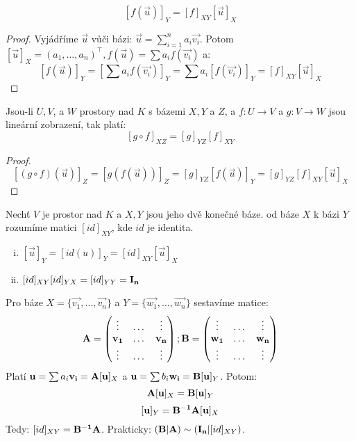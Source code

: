 \begin{observation}
    \leavevmode
    $$ [f(\vec{u})]_Y = [f]_{XY} [\vec{u}]_X$$
\end{observation}

\begin{proof}
    Vyjádříme $\vec{u}$ vůči bázi: $\vec{u} = \sum_{i=1}^{n} a_i \vec{v_i}$.
    Potom $[\vec{u}]_X = (a_1, \dots, a_n)^\top, f(\vec{u}) = 
    \sum a_i f(\vec{v_i})$ a:
    $$[f(\vec{u})]_Y = \left[\sum a_i f(\vec{v_i})\right]_Y = 
    \sum a_i [f(\vec{v_i})]_Y = [f]_{XY}[\vec{u}]_X$$
\end{proof}

\begin{observation}
    Jsou-li $U, V$, a $W$ prostory nad $K$ s bázemi $X, Y$ a $Z$, a 
    $f: U \rightarrow V$ a $g: V \rightarrow W$ jsou lineární zobrazení, tak
    platí:
    $$[g \circ f]_{XZ} = [g]_{YZ} [f]_{XY}$$
\end{observation}

\begin{proof}
    \leavevmode
    $$[(g \circ f)(\vec{u})]_Z = [g(f(\vec{u}))]_Z = [g]_{YZ}[f(\vec{u})]_Y =
    [g]_{YZ}[f]_{XY}[\vec{u}]_X$$
\end{proof}

\begin{definition}
    Nechť $V$ je prostor nad $K$ a $X, Y$ jsou jeho dvě konečné báze.
     od báze $X$ k bázi $Y$ rozumíme matici 
    $[id]_{XY}$, kde $id$ je identita.
\end{definition}

\begin{observation}
    \leavevmode
    \begin{enumerate}[i.]
        \item $[\vec{u}]_Y = [id(u)]_Y = [id]_{XY}[\vec{u}]_X$
        \item $[id]_{XY}[id]_{YX} = [id]_{YY} = \mathbf{I_n}$
    \end{enumerate}
\end{observation}

\begin{remark}[Výpočet matice přechodu pro $V = K^n$]
    Pro báze $X = \{\vec{v_1}, \dots, \vec{v_n}\}$ a 
    $Y = \{\vec{w_1}, \dots, \vec{w_n}\}$ sestavíme matice:
    $$\mathbf{A} = \begin{pmatrix}
        \vdots &\dots &\vdots \\
        \mathbf{v_1} &\dots &\mathbf{v_n} \\
        \vdots &\dots &\vdots
    \end{pmatrix}; 
    \mathbf{B} = \begin{pmatrix}
        \vdots &\dots &\vdots \\
        \mathbf{w_1} &\dots &\mathbf{w_n} \\
        \vdots &\dots &\vdots
    \end{pmatrix}$$
    Platí $\mathbf{u} = \sum a_i \mathbf{v_i} = \mathbf{A}[\mathbf{u}]_X$ a 
    $\mathbf{u} = \sum b_i \mathbf{w_i} = \mathbf{B}[\mathbf{u}]_Y$.
    Potom: 
    $$\mathbf{A}[\mathbf{u}]_X = \mathbf{B}[\mathbf{u}]_Y$$
    $$[\mathbf{u}]_Y = \mathbf{B^{-1}}\mathbf{A}[\mathbf{u}]_X$$
    Tedy: $[id]_{XY} = \mathbf{B^{-1}}\mathbf{A}$.
    Prakticky: $(\mathbf{B}|\mathbf{A}) \sim (\mathbf{I_n} | [id]_{XY})$.
\end{remark}

